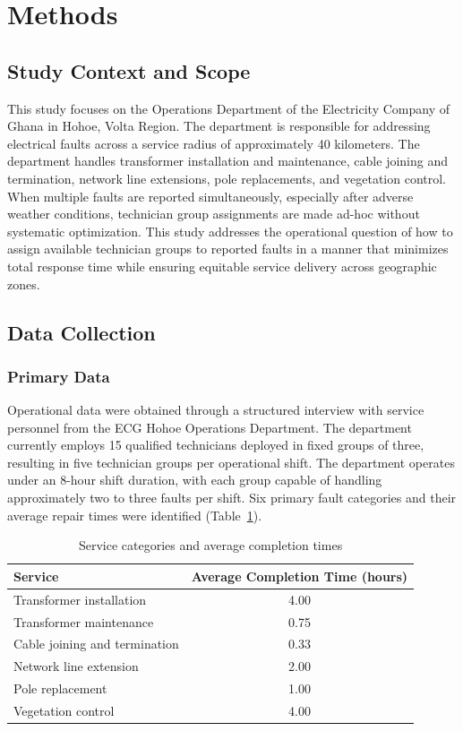 \documentclass[11pt]{article}
\begin{document}
\section*{Methods}

\subsection*{Study Context and Scope}


This study focuses on the Operations Department of the Electricity Company of Ghana
in Hohoe, Volta Region. The department is responsible for addressing electrical faults
across a service radius of approximately 40 kilometers. The department handles
transformer installation and maintenance, cable joining and termination, network line
extensions, pole replacements, and vegetation control. When multiple faults are reported
simultaneously, especially after adverse weather conditions, technician group
assignments are made ad-hoc without systematic optimization. This study addresses the
operational question of how to assign available technician groups to reported faults in
a manner that minimizes total response time while ensuring equitable service delivery
across geographic zones.

\subsection*{Data Collection}
\subsubsection*{Primary Data}
Operational data were obtained through a structured interview with service personnel
from the ECG Hohoe Operations Department. The department currently employs 15
qualified technicians deployed in fixed groups of three, resulting in five technician
groups per operational shift. The department operates under an 8-hour shift duration,
with each group capable of handling approximately two to three faults per shift.
Six primary fault categories and their average repair times were identified (Table~\ref{tab:services}).

\begin{table}[H]
\centering
\caption{Service categories and average completion times}
\label{tab:services}
\begin{tabular}{l c}
\toprule
Service & Average Completion Time (hours) \\
\midrule
Transformer installation & 4.00 \\
Transformer maintenance & 0.75 \\
Cable joining and termination & 0.33 \\
Network line extension & 2.00 \\
Pole replacement & 1.00 \\
Vegetation control & 4.00 \\
\bottomrule
\end{tabular}
\end{table}
\end{document}
